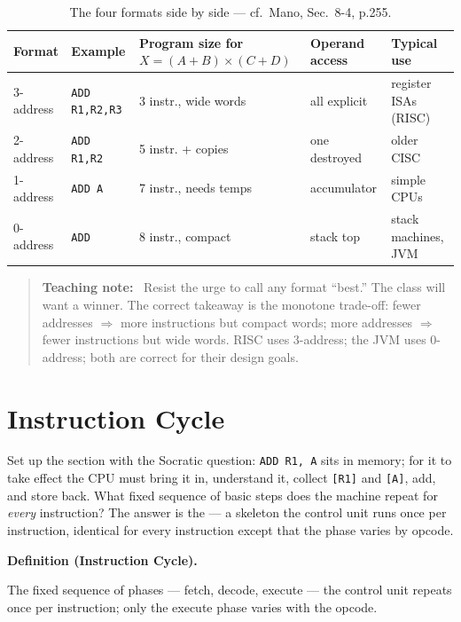 \documentclass[11pt]{article}
\newenvironment{definitionbox}[1]{%
  \par\noindent\textbf{Definition (#1).}\ \itshape
}{\par\vspace{0.3em}}
\newenvironment{teachingaside}{\begin{quote}\small\color{primary-gold}\textbf{Teaching note:}\ }{\end{quote}}
\begin{document}
\begin{table}[h]
\centering
\small
\renewcommand{\arraystretch}{1.15}
\begin{tabular}{@{}p{1.8cm}p{2.4cm}p{4.0cm}p{2.2cm}p{2.6cm}@{}}
\toprule
\textbf{Format} & \textbf{Example} & \textbf{Program size for }$X=(A{+}B)\times(C{+}D)$ & \textbf{Operand access} & \textbf{Typical use} \\
\midrule
3-address & \texttt{ADD R1,R2,R3} & 3 instr., wide words & all explicit & register ISAs (RISC) \\
2-address & \texttt{ADD R1,R2}    & 5 instr. + copies     & one destroyed      & older CISC \\
1-address & \texttt{ADD A}        & 7 instr., needs temps & accumulator        & simple CPUs \\
0-address & \texttt{ADD}          & 8 instr., compact    & stack top          & stack machines, JVM \\
\bottomrule
\end{tabular}
\caption{The four formats side by side --- cf.\ Mano, Sec.~8-4, p.255.}
\label{tab:format-summary}
\end{table}

\begin{teachingaside}
Resist the urge to call any format ``best.'' The class will want a winner. The correct takeaway is the monotone trade-off: fewer addresses $\Rightarrow$ more instructions but compact words; more addresses $\Rightarrow$ fewer instructions but wide words. RISC uses 3-address; the JVM uses 0-address; both are correct for their design goals.
\end{teachingaside}

\section{Instruction Cycle}

Set up the section with the Socratic question: \texttt{ADD R1, A} sits in memory; for it to take effect the CPU must bring it in, understand it, collect \texttt{[R1]} and \texttt{[A]}, add, and store back. What fixed sequence of basic steps does the machine repeat for \emph{every} instruction? The answer is the  --- a skeleton the control unit runs once per instruction, identical for every instruction except that the  phase varies by opcode.

\begin{definitionbox}{Instruction Cycle}
The fixed sequence of phases --- fetch, decode, execute --- the control unit repeats once per instruction; only the execute phase varies with the opcode.
\end{definitionbox}
\end{document}
